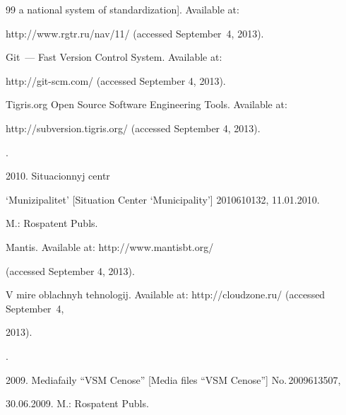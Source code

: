 {{\begin{thebibliography}{99}
a national system of standardization]. Available at: 


{\sf http://www.rgtr.ru/nav/11/} (accessed September~4, 2013). 




Git~--- Fast Version  Control System. Available at: 


{\sf http://git-scm.com/} (accessed September 4, 2013). 




Tigris.org Open Source Software Engineering Tools. Available at: 


{\sf http://\linebreak subversion.tigris.org/} (accessed September 4, 2013). 







.


2010. Situacionnyj centr 


`Munizipalitet' [Situation Center `Municipality'] 2010610132, 11.01.2010. 


M.: Rospatent Publs. 







Mantis.  Available at: {\sf http://www.mantisbt.org/}


(accessed September 4, 2013). 




V mire oblachnyh tehnologij. Available at: {\sf http://cloudzone.ru/} (accessed September~4, 


2013). 







.


2009. Mediafaily ``VSM Cenose'' [Media files ``VSM Cenose''] No.\,2009613507, 


30.06.2009. M.: Rospatent Publs. 










\end{thebibliography}}}
